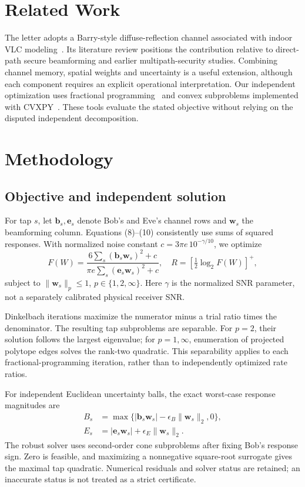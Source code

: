 \documentclass[conference]{IEEEtran}
\begin{document}
\section{Related Work}
The letter adopts a Barry-style diffuse-reflection channel associated with indoor VLC modeling~\cite{lee}. Its literature review positions the contribution relative to direct-path secure beamforming and earlier multipath-security studies. Combining channel memory, spatial weights and uncertainty is a useful extension, although each component requires an explicit operational interpretation. Our independent optimization uses fractional programming~\cite{dinkelbach} and convex subproblems implemented with CVXPY~\cite{cvxpy}. These tools evaluate the stated objective without relying on the disputed independent decomposition.

\section{Methodology}
\subsection{Objective and independent solution}
For tap $s$, let $\mathbf b_s,\mathbf e_s$ denote Bob's and Eve's channel rows and $\mathbf w_s$ the beamforming column. Equations (8)--(10) consistently use sums of squared responses. With normalized noise constant $c=3\pi e\,10^{-\gamma/10}$, we optimize
\begin{equation}
 F(W)=\frac{6\sum_s(\mathbf b_s\mathbf w_s)^2+c}
 {\pi e\sum_s(\mathbf e_s\mathbf w_s)^2+c},\quad
 R=\left[\tfrac12\log_2 F(W)\right]^+,
\end{equation}
subject to $\|\mathbf w_s\|_p\leq1$, $p\in\{1,2,\infty\}$. Here $\gamma$ is the normalized SNR parameter, not a separately calibrated physical receiver SNR.

Dinkelbach iterations maximize the numerator minus a trial ratio times the denominator. The resulting tap subproblems are separable. For $p=2$, their solution follows the largest eigenvalue; for $p=1,\infty$, enumeration of projected polytope edges solves the rank-two quadratic. This separability applies to each fractional-programming iteration, rather than to independently optimized rate ratios.

For independent Euclidean uncertainty balls, the exact worst-case response magnitudes are
\begin{align}
 B_s&=\max\{|\mathbf b_s\mathbf w_s|-\epsilon_B\|\mathbf w_s\|_2,0\},\\
 E_s&=|\mathbf e_s\mathbf w_s|+\epsilon_E\|\mathbf w_s\|_2.
\end{align}
The robust solver uses second-order cone subproblems after fixing Bob's response sign. Zero is feasible, and maximizing a nonnegative square-root surrogate gives the maximal tap quadratic. Numerical residuals and solver status are retained; an inaccurate status is not treated as a strict certificate.
\end{document}
